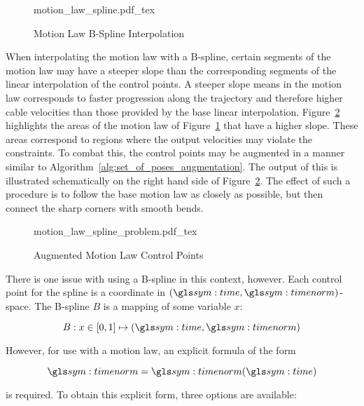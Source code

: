 	\begin{figure}[hb]
		\centering
		\def\svgwidth{\textwidth}
		{motion_law_spline.pdf_tex}
		\caption{Motion Law B-Spline Interpolation}%
		\label{fig:motion_law_spline}
	\end{figure}

	When interpolating the motion law with a B-spline, certain segments of the
	motion law may have a steeper slope than the corresponding segments of the
	linear interpolation of the control points. A steeper slope
	means in the motion law corresponds to faster progression along the
	trajectory and therefore higher cable velocities than those provided by the
	base linear interpolation.
	Figure~\ref{fig:augmented_motion_law_control_points} highlights the areas of
	the motion law of Figure~\ref{fig:motion_law_spline} that have a higher
	slope. These areas correspond to regions where the output velocities may
	violate the constraints. To combat this, the control points may be augmented
	in a manner similar to Algorithm~\ref{alg:set_of_poses_augmentation}. The
	output of this is illustrated schematically on the right hand side of
	Figure~\ref{fig:augmented_motion_law_control_points}. The effect of such a
	procedure is to follow the base motion law as closely as possible, but then
	connect the sharp corners with smooth bends.

	\begin{figure}[hb]
		\centering
		\def\svgwidth{\textwidth}
		{motion_law_spline_problem.pdf_tex}
		\caption{Augmented Motion Law Control Points}%
		\label{fig:augmented_motion_law_control_points}
	\end{figure}

	There is one issue with using a B-spline in this context, however. Each
	control point for the spline is a coordinate in
	\(
		\left(
			\timesym, \timenorm
		\right)
	\)-space. The B-spline $B$ is a mapping of some variable $x$:

	\begin{equation}
		B: x \in [0, 1] \mapsto \left(\timesym, \timenorm\right)
	\end{equation}

	However, for use with a motion law, an explicit formula of the form

	\begin{equation}
		\timenorm = \timenorm(\timesym)
		\label{eq:direct_relation_motion_law_spline}
	\end{equation}

	is required. To obtain this explicit form, three options are available:


